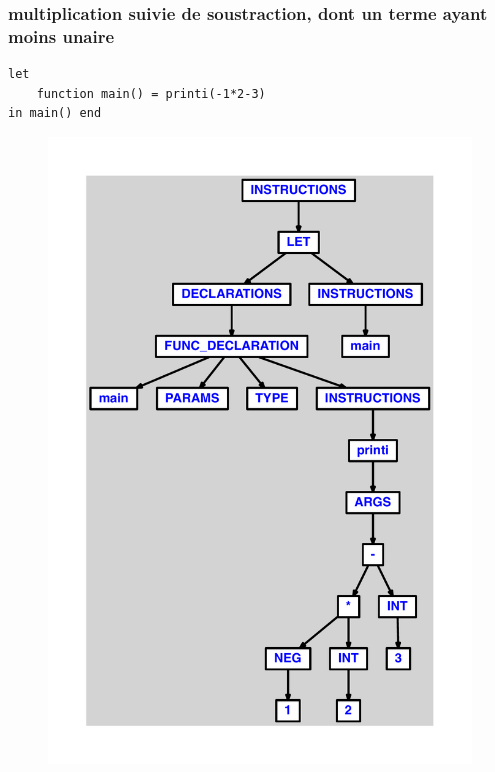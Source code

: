 \documentclass{article}
\begin{document}
\subsubsection{multiplication suivie de soustraction, dont un terme ayant moins unaire}
\begin{lstlisting}
let
	function main() = printi(-1*2-3)
in main() end
\end{lstlisting}
\newpage
\begin{figure}[H]
\centering
\includegraphics[max width=\textwidth]{ast/ast_72.pdf}
\end{figure}
\newpage
\end{document}
